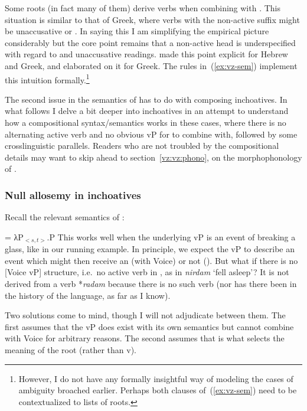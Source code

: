 \begin{exe}
\begin{xlist}
\begin{xlist}
\begin{exe}
\begin{xlist}
\begin{xlist}
\begin{exe}
\begin{xlist}
\begin{xlist}
\begin{exe}
\begin{exe}
\begin{xlist}
\begin{exe}
\begin{exe}
\begin{xlist}
\begin{exe}
\begin{exe}
\begin{exe}
\begin{exe}
\begin{exe}
\begin{xlist}
\begin{exe}
\begin{xlist}
\begin{exe}
\begin{exe}
\begin{xlist}
\begin{exe}
\begin{xlist}
\begin{exe}
\begin{exe}
\begin{exe}
\begin{xlist}
Some roots (in fact many of them) derive  verbs when combining with {\tnif}. This situation is similar to that of Greek, where verbs with the non-active suffix might be unaccusative or . In saying this I am simplifying the empirical picture considerably but the core point remains that a non-active head is underspecified with regard to  and unaccusative readings. \cite{alexiadoudoron12} made this point explicit for Hebrew and Greek, and \cite{layering15} elaborated on it for Greek. The rules in~(\ref{ex:vz-sem}) implement this intuition formally.\footnote{However, I do not have any formally insightful way of modeling the cases of ambiguity broached earlier. Perhaps both clauses of~(\ref{ex:vz-sem}) need to be contextualized to lists of roots.}

The second issue in the semantics of {\vz} has to do with composing inchoatives. In what follows I delve a bit deeper into inchoatives in an attempt to understand how a compositional syntax/semantics works in these cases, where there is no alternating active verb and no obvious vP for {\vz} to combine with, followed by some crosslinguistic parallels. Readers who are not troubled by the compositional details may want to skip ahead to section~\ref{vz:vz:phono}, on the morphophonology of {\vz}.

  		\subsubsection{Null allosemy in inchoatives} \label{vz:inch:analysis}
Recall the relevant semantics of {\vz}:
 \begin{exe}
\ex  \denote{\vz} = λP$_{<s,t>}$.P
 \z 
This works well when the underlying vP is an event of breaking a glass, like in our running example. In principle, we expect the vP to describe an event which might then receive an  (with Voice) or not ({\vz}). But what if there is no [Voice vP] structure, i.e.~no active verb in {\tkal}, as in \emph{nirdam} `fell asleep'? It is not derived from a  verb *\emph{radam} because there is no such verb (nor has there been in the history of the language, as far as I know).

Two solutions come to mind, though I will not adjudicate between them. The first assumes that the vP does exist with its own semantics but cannot combine with Voice for arbitrary reasons. The second assumes that {\vz} is what selects the meaning of the root (rather than v).


\end{exe}
\end{xlist}
\end{exe}
\end{exe}
\end{exe}
\end{xlist}
\end{exe}
\end{xlist}
\end{exe}
\end{exe}
\end{xlist}
\end{exe}
\end{xlist}
\end{exe}
\end{exe}
\end{exe}
\end{exe}
\end{exe}
\end{xlist}
\end{exe}
\end{exe}
\end{xlist}
\end{exe}
\end{exe}
\end{xlist}
\end{xlist}
\end{exe}
\end{xlist}
\end{xlist}
\end{exe}
\end{xlist}
\end{xlist}
\end{exe}
